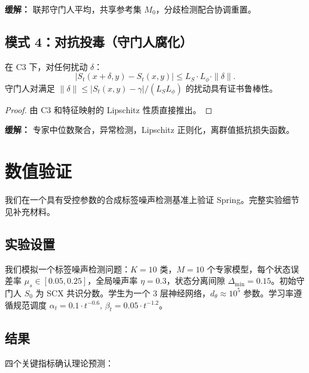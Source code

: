 \textbf{缓解：} 联邦守门人平均，共享参考集 $M_0$，分歧检测配合协调重置。

\subsection{模式 4：对抗投毒（守门人腐化）}

\begin{proposition}\label{prop:robust-cert}
在 C3 下，对任何扰动 $\delta$：
\begin{equation}
    |S_t(x + \delta, y) - S_t(x, y)| \leq L_S \cdot L_\phi \cdot \|\delta\|.
\end{equation}
守门人对满足 $\|\delta\| \leq |S_t(x,y) - \gamma|/(L_S L_\phi)$ 的扰动具有证书鲁棒性。
\end{proposition}

\begin{proof}
由 C3 和特征映射的 Lipschitz 性质直接推出。
\end{proof}

\textbf{缓解：} 专家中位数聚合，异常检测，Lipschitz 正则化，离群值抵抗损失函数。

\section{数值验证}

我们在一个具有受控参数的合成标签噪声检测基准上验证 Spring。完整实验细节见补充材料。

\subsection{实验设置}

我们模拟一个标签噪声检测问题：$K = 10$ 类，$M = 10$ 个专家模型，每个状态误差率 $\mu_s \in [0.05, 0.25]$，全局噪声率 $\eta = 0.3$，状态分离间隙 $\Delta_{\min} = 0.15$。初始守门人 $S_0$ 为 SCX 共识分数。学生为一个 3 层神经网络，$d_\theta \approx 10^5$ 参数。学习率遵循规范调度 $\alpha_t = 0.1 \cdot t^{-0.6}$, $\beta_t = 0.05 \cdot t^{-1.2}$。

\subsection{结果}

四个关键指标确认理论预测：

